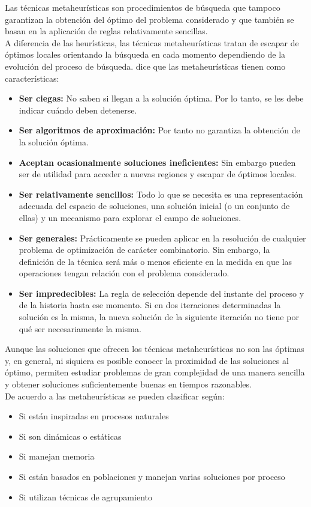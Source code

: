 Las técnicas metaheurísticas son procedimientos de búsqueda que tampoco garantizan la obtención del óptimo del problema considerado y que también se basan en la aplicación de reglas relativamente sencillas.\\ 
\hspace*{1cm}A diferencia de las heurísticas, las técnicas metaheurísticas tratan de escapar de óptimos locales orientando la búsqueda en cada momento dependiendo de la evolución del proceso de búsqueda. \cite{[SADIQBIB]} dice que las metaheurísticas tienen como características:
\begin{itemize}
\item \textbf{Ser ciegas: } No saben si llegan a la solución óptima. Por lo tanto, se les debe indicar cuándo deben detenerse.
\item \textbf{Ser algoritmos de aproximación:} Por tanto no garantiza la obtención de la solución óptima.
\item \textbf{Aceptan ocasionalmente soluciones ineficientes: } Sin embargo pueden ser de utilidad para acceder a nuevas regiones y escapar de óptimos locales.
\item \textbf{Ser relativamente sencillos:} Todo lo que se necesita es una representación
adecuada del espacio de soluciones, una solución inicial (o un conjunto de ellas) y un mecanismo para explorar el campo de soluciones.
\item \textbf{Ser generales:} Prácticamente se pueden aplicar en la resolución de cualquier problema de optimización de carácter combinatorio. Sin embargo, la definición de la técnica será más o menos eficiente en la medida en que las operaciones tengan relación con el problema considerado.
\item \textbf{Ser impredecibles:} La regla de selección depende del instante del proceso y de la historia hasta ese momento. Si en dos iteraciones determinadas la solución es la misma, la nueva solución de la siguiente iteración no tiene por qué ser necesariamente la misma.
\end{itemize}

\hspace*{1cm}Aunque las soluciones que ofrecen los técnicas metaheurísticas no son las óptimas y, en general, ni siquiera es posible conocer la proximidad de las soluciones al óptimo, permiten estudiar problemas de gran complejidad de una manera sencilla y obtener soluciones suficientemente buenas en tiempos razonables.\\

De acuerdo a \cite{[BLUMROLI]} las metaheurísticas se pueden clasificar según:
\begin{itemize}
    \item Si están inspiradas en procesos naturales
    \item Si son dinámicas o estáticas
    \item Si manejan memoria
    \item Si están basados en poblaciones y manejan varias soluciones por proceso
    \item Si utilizan técnicas de agrupamiento 
\end{itemize}

